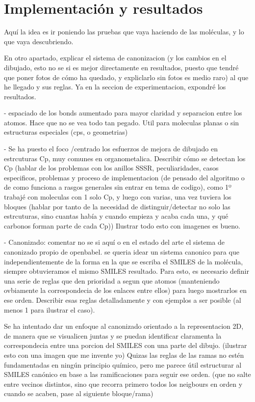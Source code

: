 
\chapter{Implementación y resultados}

Aquí la idea es ir poniendo las pruebas que vaya haciendo de las moléculas, y lo que vaya descubriendo.

En otro apartado, explicar el sistema de canonizacion (y los cambios en el dibujado, esto no se si es mejor directamente en resultados, puesto que tendré que poner fotos de cómo ha quedado, y expliclarlo sin fotos es medio raro) al que he llegado y sus reglas. Ya en la seccion de experimentacion, expondré los resultados.

 - espaciado de los bonds aumentado para mayor claridad y separacion entre los atomos. Hace que no se vea todo tan pegado. Util para moleculas planas o sin estructuras especiales (cps, o geometrias)

 - Se ha puesto el foco /centrado los esfuerzos de mejora de dibujado en estrcuturas Cp, muy comunes en organometalica. Describir cómo se detectan los Cp (hablar de los problemas con los anillos SSSR, peculiaridades, casos especificos, problemas y proceso de implementacion (de pensado del algoritmo o de como funciona a rasgos generales sin entrar en tema de codigo), como 1º trabajé con moleculas con 1 solo Cp, y luego con varias, una vez tuviera los bloques (hablar por tanto de la necesidad de distinguir/detectar no solo las estrcuturas, sino cuantas había y cuando empieza y acaba cada una, y qué carbonos forman parte de cada Cp))
 Ilustrar todo esto con imagenes es bueno.

 - Canonizado: comentar no se si aquí o en el estado del arte el sistema de canonizado propio de openbabel. se queria idear un sistema canonico para que independientemente de la forma en la que se escriba el SMILES de la molécula, siempre obtuvieramos el mismo SMILES resultado. Para esto, es necesario definir una serie de reglas que den prioridad a segun que atomos (manteniendo ovbiamente la correspondecia de los enlaces entre ellos) para luego mostrarlos en ese orden. Describir esas reglas detalladamente y con ejemplos a ser posible (al menos 1 para ilustrar el caso).

Se ha intentado dar un enfoque al canonizado orientado a la representacion 2D, de manera que se visualicen juntas y se puedan identificar claramenta la correspondecia entre una porcion del SMILES con una parte del dibujo. (ilustrar esto con una imagen que me invente yo) Quizas las reglas de las ramas no estén fundamentadas en ningún principio químico, pero me parece útil estructurar al SMILES canónico en base a las ramificaciones para seguir ese orden. (que no salte entre vecinos distintos, sino que recorra primero todos los neigbours en orden y cuando se acaben, pase al siguiente bloque/rama)

